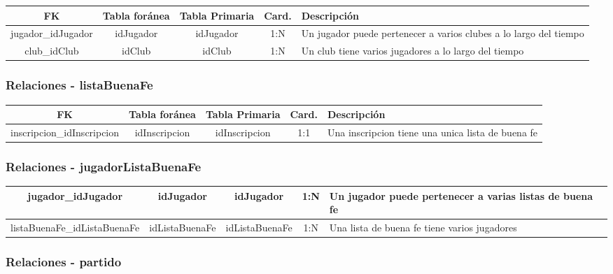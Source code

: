 \begin{table}[H]
	\centering
	\begin{tabularx}{\textwidth}{|c|c|c|c|X|} \hline
		\textbf{FK} & \textbf{Tabla foránea} & \textbf{Tabla Primaria} & \textbf{Card.} & \textbf{Descripción} \\ \hline
		jugador\_idJugador & idJugador & idJugador & 1:N & Un jugador puede pertenecer a varios clubes a lo largo del tiempo \\ \hline
		club\_idClub & idClub & idClub & 1:N & Un club tiene varios jugadores a lo largo del tiempo \\ \hline
	\end{tabularx}
\end{table}

\subsubsection{Relaciones - listaBuenaFe}

\begin{table}[H]
	\centering
	\begin{tabularx}{\textwidth}{|c|c|c|c|X|} \hline
		\textbf{FK} & \textbf{Tabla foránea} & \textbf{Tabla Primaria} & \textbf{Card.} & \textbf{Descripción} \\ \hline
		inscripcion\_idInscripcion & idInscripcion & idInscripcion & 1:1 & Una inscripcion tiene una unica lista de buena fe \\ \hline
	\end{tabularx}
\end{table}

\subsubsection{Relaciones - jugadorListaBuenaFe}

\begin{table}[H]
	\centering
	\begin{tabularx}{\textwidth}{|c|c|c|c|X|} \hline
		jugador\_idJugador & idJugador & idJugador & 1:N & Un jugador puede pertenecer a varias listas de buena fe \\ \hline
		listaBuenaFe\_idListaBuenaFe & idListaBuenaFe & idListaBuenaFe & 1:N & Una lista de buena fe tiene varios jugadores \\ \hline
	\end{tabularx}
\end{table}

\subsubsection{Relaciones - partido}

